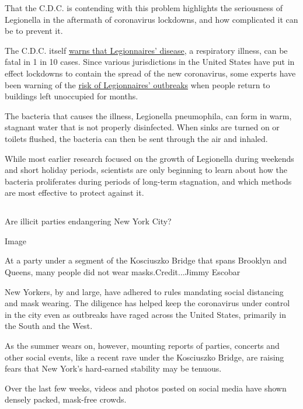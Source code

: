 That the C.D.C. is contending with this problem highlights the
seriousness of Legionella in the aftermath of coronavirus lockdowns, and
how complicated it can be to prevent it.

The C.D.C. itself \href{https://www.cdc.gov/legionella/index.html}{warns
that Legionnaires' disease}, a respiratory illness, can be fatal in 1 in
10 cases. Since various jurisdictions in the United States have put in
effect lockdowns to contain the spread of the new coronavirus, some
experts have been warning of the
\href{https://www.nytimes.com/2020/05/20/health/coronavirus-legionnaires-offices.html}{risk
of Legionnaires' outbreaks} when people return to buildings left
unoccupied for months.

The bacteria that causes the illness, Legionella pneumophila, can form
in warm, stagnant water that is not properly disinfected. When sinks are
turned on or toilets flushed, the bacteria can then be sent through the
air and inhaled.

While most earlier research focused on the growth of Legionella during
weekends and short holiday periods, scientists are only beginning to
learn about how the bacteria proliferates during periods of long-term
stagnation, and which methods are most effective to protect against it.

\hypertarget{section-9}{%
\subsection{}\label{section-9}}

Are illicit parties endangering New York City?

Image

At a party under a segment of the Kosciuszko Bridge that spans Brooklyn
and Queens, many people did not wear masks.Credit...Jimmy Escobar

New Yorkers, by and large, have adhered to rules mandating social
distancing and mask wearing. The diligence has helped keep the
coronavirus under control in the city even as outbreaks have raged
across the United States, primarily in the South and the West.

As the summer wears on, however, mounting reports of parties, concerts
and other social events, like a recent rave under the Kosciuszko Bridge,
are raising fears that New York's hard-earned stability may be tenuous.

Over the last few weeks, videos and photos posted on social media have
shown densely packed, mask-free crowds.

